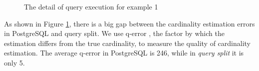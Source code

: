 \begin{figure}[htb]
{\begin{minipage}[t]{0.47\linewidth}
            \end{minipage}
        }
        \centering
        \caption{The detail of query execution for example 1}
        \label{F15}
        \Description{}
    \end{figure}\par
    As shown in Figure \ref{F15}, there is a big gap between the cardinality estimation errors in PostgreSQL and query split. We use q-error \cite{paper53}, the factor by which the estimation differs from the true cardinality, to measure the quality of cardinality estimation. The average q-error in PostgreSQL is 246, while in \textit{query split} it is only 5.\par
